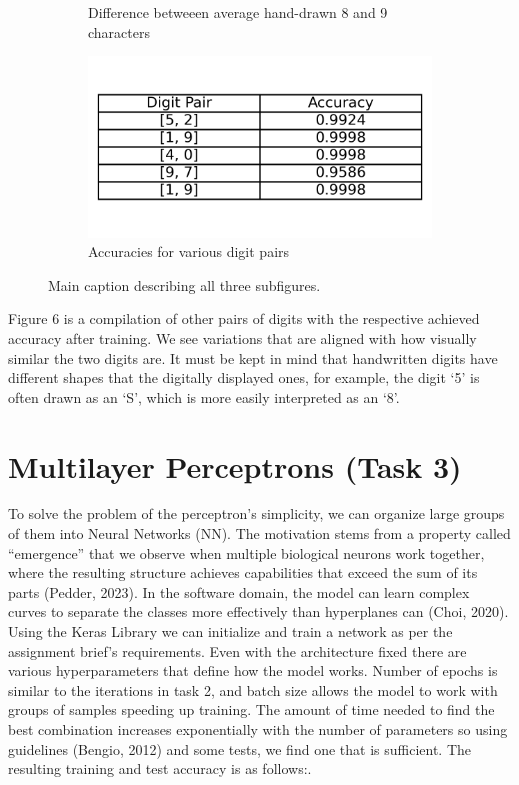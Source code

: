 \documentclass{article}
\begin{document}
\begin{figure}[h!]
\begin{subfigure}[t]{0.3\textwidth}
        \caption{Difference betweeen average hand-drawn 8 and 9 characters}
        \label{fig:plot7b}
    \end{subfigure}
    \hspace{0.01\textwidth}
    \begin{subfigure}[t]{0.3\textwidth}
        \centering
        \includegraphics[width=\textwidth]{./plots/plot8.png} %
        \caption{Accuracies for various digit pairs}
        \label{fig:plot7c}
    \end{subfigure}

    \caption{Main caption describing all three subfigures.}
    \label{fig:main_figure}
\end{figure}

Figure 6 is a compilation of other pairs of digits with the respective achieved accuracy after training.
We see variations that are aligned with how visually similar the two digits are.
It must be kept in mind that handwritten digits have different shapes that the digitally displayed ones, for example, the digit ‘5’ is often drawn as an ‘S’, which is more easily interpreted as an ‘8’.

\section{Multilayer Perceptrons (Task 3)}

To solve the problem of the perceptron’s simplicity, we can organize large groups of them into Neural Networks (NN).
The motivation stems from a property called “emergence” that we observe when multiple biological neurons work together, where the resulting structure achieves capabilities that exceed the sum of its parts (Pedder, 2023).
In the software domain, the model can learn complex curves to separate the classes more effectively than hyperplanes can (Choi, 2020).
Using the Keras Library we can initialize and train a network as per the assignment brief’s requirements.
Even with the architecture fixed there are various hyperparameters that define how the model works.
Number of epochs is similar to the iterations in task 2, and batch size allows the model to work with groups of samples speeding up training.
The amount of time needed to find the best combination increases exponentially with the number of parameters so using guidelines (Bengio, 2012) and some tests, we find one that is sufficient.
The resulting training and test accuracy is as follows:.
\end{document}
